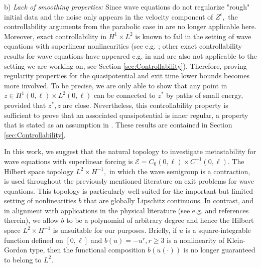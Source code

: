 \documentclass[10pt, reqno]{amsart}
\newcommand{\e}{\mathcal{E}}
\theoremstyle{definition}
\numberwithin{lem}{section}
\numberwithin{cor}{section}
\numberwithin{prop}{section}
\numberwithin{thm}{section}
\numberwithin{dfn}{section}
\begin{document}
    b)\textit{ Lack of smoothing properties:} Since wave equations do not regularize "rough" initial data and the noise only appears in the velocity component of  $Z^\epsilon,$
    the controllability arguments from the parabolic case in \cite{salins2021metastability} are no longer applicable here. Moreover, exact controllability in $H^1\times L^2$ is known to fail in the setting of wave equations with superlinear nonlinearities (see e.g. \cite[Theorem 2]{Zuazua1993}; other exact controllability results for wave equations have appeared e.g. in \cite{FuYongZhang_ExactControlability2007,lasiecka1991exact} and are also not applicable to the setting we are working on, see Section \ref{sec:Controllability}). Therefore, proving regularity properties for the quasipotential and exit time lower bounds becomes more involved. To be precise, we are only able to show that any point in $z\in H^1(0,\ell)\times L^2(0,\ell)$ can be connected to $z^*$ by paths of small energy, provided that $z^*, z$ are close. Nevertheless, this controllability property is sufficient to prove that an associated quasipotential is inner regular, a property that is stated as an assumption in \cite{salins2019uniform}. These results are contained in Section \ref{sec:Controllability}.
    
    In this work, we suggest that the natural topology to investigate metastability for wave equations with superlinear forcing is $\e=C_0(0,\ell)\times C^{-1}(0,\ell).$ The Hilbert space topology $L^2 \times H^{-1},$ in which the wave semigroup is a contraction, is used throughout the previously mentioned literature on exit problems for wave equations. This topology is particularly well-suited for the important but limited setting of nonlinearities $b$ that are globally Lipschitz continuous. In contrast, and in alignment with applications in the physical literature (see e.g. \cite{campbell1983resonance} and references therein), we allow $b$ to be a polynomial of arbitrary degree and hence the Hilbert space $L^2 \times H^{-1}$ is unsuitable for our purposes. Briefly, if $u$ is a square-integrable function defined on $[0,\ell]$ and $b(u) = -u^r, r\geq 3$ is a nonlinearity of Klein-Gordon type, then the functional composition $b(u(\cdot))$ is no longer guaranteed to belong to $L^2$.
    
\end{document}
